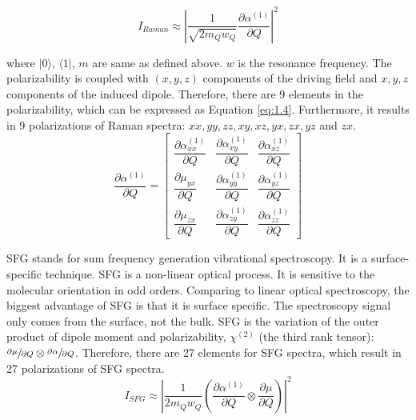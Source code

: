 \begin{equation} \label{eq:1.3}
I_{Raman} \approx \left| \frac{1}{\sqrt{2m_{Q}w_{Q}}} \frac{\partial\alpha^{(1)}}{\partial Q} \right|^{2}
\end{equation}

where $|0\rangle$, $\langle 1|$, $m$ are same as defined above. $w$ is the resonance frequency. The polarizability is coupled with $(x, y, z)$ components of the driving field and $x, y, z$ components of the induced dipole. Therefore, there are 9 elements in the polarizability, which can be expressed as Equation \ref{eq:1.4}. Furthermore, it results in 9 polarizations of Raman spectra: $xx, yy, zz, xy, xz, yx, zx, yz$ and $zx$. \\

\begin{equation} \label{eq:1.4}
\frac{\partial\alpha^{(1)}}{\partial Q} = \begin{bmatrix}
\dfrac{\partial\alpha_{xx}^{(1)}}{\partial Q} & \dfrac{\partial\alpha_{xy}^{(1)}}{\partial Q} & \dfrac{\partial\alpha_{xz}^{(1)}}{\partial Q} \\
\dfrac{\partial\mu_{yx}}{\partial Q} & \dfrac{\partial\alpha_{yy}^{(1)}}{\partial Q} & \dfrac{\partial\alpha_{yz}^{(1)}}{\partial Q}\\
\dfrac{\partial\mu_{zx}}{\partial Q} & \dfrac{\partial\alpha_{zy}^{(1)}}{\partial Q} & \dfrac{\partial\alpha_{zz}^{(1)}}{\partial Q}
\end{bmatrix}
\end{equation}

SFG stands for sum frequency generation vibrational spectroscopy. It is a surface-specific technique. SFG is a non-linear optical process. It is sensitive to the molecular orientation in odd orders. Comparing to linear optical spectroscopy, the biggest advantage of SFG is that it is surface specific. The spectroscopy signal only comes from the surface, not the bulk. SFG is the variation of the outer product of dipole moment and polarizability, $\chi^{(2)}$ (the third rank tensor): $\sfrac{\partial\mu}{\partial Q} \otimes \sfrac{\partial\alpha}{\partial Q} $. Therefore, there are 27 elements for SFG spectra, which result in 27 polarizations of SFG spectra. \\

\begin{equation} \label{eq:1.5}
I_{SFG} \approx \left| \frac{1}{2m_{Q}w_{Q}} \left( \frac{\partial\alpha^{(1)}}{\partial Q} \otimes \frac{\partial\mu}{\partial Q} \right) \right|^{2}
\end{equation}

